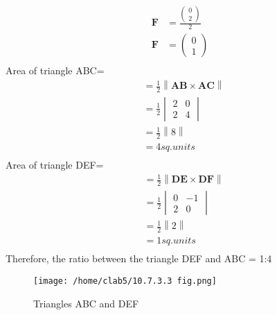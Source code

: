\documentclass{article}
\newcommand{\myvec}[1]{\ensuremath{\begin{pmatrix}#1\end{pmatrix}}}
\newcommand{\mydet}[1]{\ensuremath{\begin{vmatrix}#1\end{vmatrix}}}
\providecommand{\norm}[1]{\left\lVert#1\right\rVert}
\let\vec\mathbf
\begin{document}
\begin{enumerate}
\begin{align}
    \vec{F} &= \frac{\myvec{0\\2}}{2}\\
    \vec{F} &= \myvec{0\\1}\\
\end{align}
Area of triangle ABC=
 \begin{align}
 &=\frac{1}{2}\norm{\vec{AB}\times\vec{AC}}\\
  &=\frac{1}{2}\mydet{2&0\\2&4}\\
   &=\frac{1}{2}\norm{8}\\
    &=4 sq.units\\
\end{align}
Area of triangle DEF= 
 \begin{align}
 &=\frac{1}{2}\norm{\vec{DE}\times\vec{DF}}\\
  &=\frac{1}{2}\mydet{0&-1\\2&0}\\
   &=\frac{1}{2}\norm{2}\\
    &=1 sq.units\\
 \end{align}
 Therefore, the ratio between the triangle DEF and ABC = 1:4
\end{enumerate}
\begin{figure}[H]
			\centering
			\texttt{[image: /home/clab5/10.7.3.3 fig.png]}
			\caption{Triangles ABC and DEF}
			\label{fig:tri2}
		\end{figure}
\end{document}
